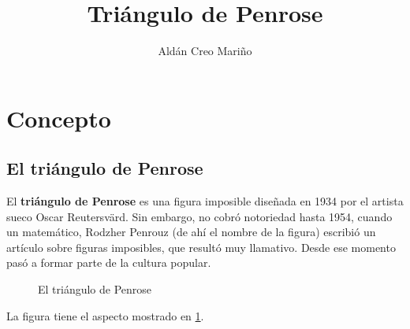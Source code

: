 \documentclass[a4paper,12pt]{article}
\title{Triángulo de Penrose}
\date{}
\author{Aldán Creo Mariño}
\begin{document}
\maketitle

\newpage
\tableofcontents
\newpage

\section{Concepto}
\subsection{El triángulo de Penrose}

El \textbf{triángulo de Penrose} es una figura imposible diseñada en 1934 por el artista sueco Oscar Reutersvärd. Sin embargo, no cobró notoriedad hasta 1954, cuando un matemático, Rodzher Penrouz (de ahí el nombre de la figura) escribió un artículo sobre figuras imposibles, que resultó muy llamativo. Desde ese momento pasó a formar parte de la cultura popular.

\begin{figure}[h]
    \centering
    \caption{El triángulo de Penrose} \label{imagen_triangulo}
\end{figure}

La figura tiene el aspecto mostrado en \ref{imagen_triangulo}.
\end{document}
